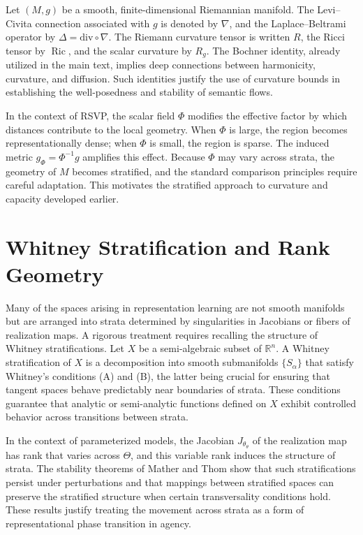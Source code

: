 \documentclass[12pt]{article}
\theoremstyle{plain}
\theoremstyle{definition}
\theoremstyle{remark}
\DeclareMathOperator{\Ric}{Ric}
\newcommand{\ThetaSpace}{\Theta}
\newcommand{\ParamJac}{J_\theta}
\begin{document}
Let $(M,g)$ be a smooth, finite-dimensional Riemannian manifold. The Levi--Civita connection associated with $g$ is denoted by $\nabla$, and the Laplace--Beltrami operator by $\Delta = \mathrm{div}\circ\nabla$. The Riemann curvature tensor is written $R$, the Ricci tensor by $\Ric$, and the scalar curvature by $R_g$. The Bochner identity, already utilized in the main text, implies deep connections between harmonicity, curvature, and diffusion. Such identities justify the use of curvature bounds in establishing the well-posedness and stability of semantic flows.

In the context of RSVP, the scalar field $\Phi$ modifies the effective factor by which distances contribute to the local geometry. When $\Phi$ is large, the region becomes representationally dense; when $\Phi$ is small, the region is sparse. The induced metric $g_\Phi = \Phi^{-1} g$ amplifies this effect. Because $\Phi$ may vary across strata, the geometry of $M$ becomes stratified, and the standard comparison principles require careful adaptation. This motivates the stratified approach to curvature and capacity developed earlier.

\section{Whitney Stratification and Rank Geometry}
\label{app:whitney}

Many of the spaces arising in representation learning are not smooth manifolds but are arranged into strata determined by singularities in Jacobians or fibers of realization maps. A rigorous treatment requires recalling the structure of Whitney stratifications. Let $X$ be a semi-algebraic subset of $\mathbb{R}^n$. A Whitney stratification of $X$ is a decomposition into smooth submanifolds $\{S_\alpha\}$ that satisfy Whitney's conditions (A) and (B), the latter being crucial for ensuring that tangent spaces behave predictably near boundaries of strata. These conditions guarantee that analytic or semi-analytic functions defined on $X$ exhibit controlled behavior across transitions between strata.

In the context of parameterized models, the Jacobian $\ParamJac_\theta$ of the realization map has rank that varies across $\ThetaSpace$, and this variable rank induces the structure of strata. The stability theorems of Mather and Thom show that such stratifications persist under perturbations and that mappings between stratified spaces can preserve the stratified structure when certain transversality conditions hold. These results justify treating the movement across strata as a form of representational phase transition in agency.
\end{document}
